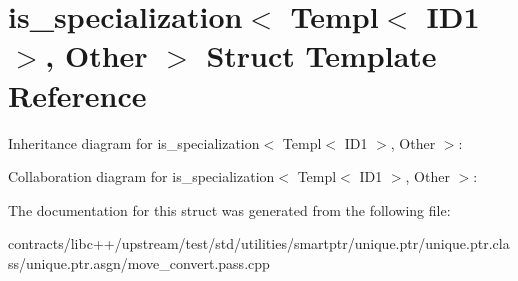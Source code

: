 \hypertarget{structis__specialization_3_01_templ_3_01_i_d1_01_4_00_01_other_01_4}{}\section{is\+\_\+specialization$<$ Templ$<$ I\+D1 $>$, Other $>$ Struct Template Reference}
\label{structis__specialization_3_01_templ_3_01_i_d1_01_4_00_01_other_01_4}


Inheritance diagram for is\+\_\+specialization$<$ Templ$<$ I\+D1 $>$, Other $>$\+:


Collaboration diagram for is\+\_\+specialization$<$ Templ$<$ I\+D1 $>$, Other $>$\+:


The documentation for this struct was generated from the following file\+:\begin{DoxyCompactItemize}
\item 
contracts/libc++/upstream/test/std/utilities/smartptr/unique.\+ptr/unique.\+ptr.\+class/unique.\+ptr.\+asgn/move\+\_\+convert.\+pass.\+cpp\end{DoxyCompactItemize}
